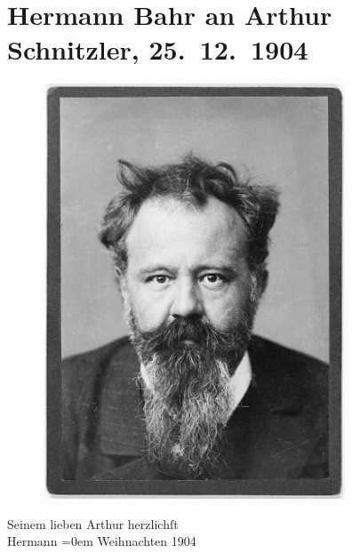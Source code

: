 

         \renewcommand{\erwaehnteOrte}{Orte: Wien}
         \renewcommand{\erwaehnteWerke}{}
               \section[Hermann Bahr an Arthur Schnitzler, 25. 12. 1904]{ Hermann Bahr an Arthur Schnitzler, 25. 12. 1904}\nopagebreak{}\rehead{ }\begin{ledgroupsized}[t]{13cm}\normalsize\beginnumbering \toendnotes[C]{\smallbreak\pagebreak[2]} 
\begin{figure}[H]\centering\includegraphics[width=9cm]{../tex-inputs/img/img6322-44r.jpg}\end{figure}\pstart
           \noindent{}{\pb}Seinem lieben Arthur\pend
           \pstart
           herzlichſt{\\[\baselineskip]}\spacefill\mbox{Hermann}\pend
           \leftskip=0em{}\pstart
           Weihnachten 1904\pend
           
         
         \endnumbering{}\end{ledgroupsized}  \newcommand{\dateiname}{L01483}\newcommand{\titel}{Hermann Bahr an Arthur Schnitzler, 25. 12. 1904}\newcommand{\editorInnen}{ Kurt Ifkovits,  Martin Anton Müller}
      